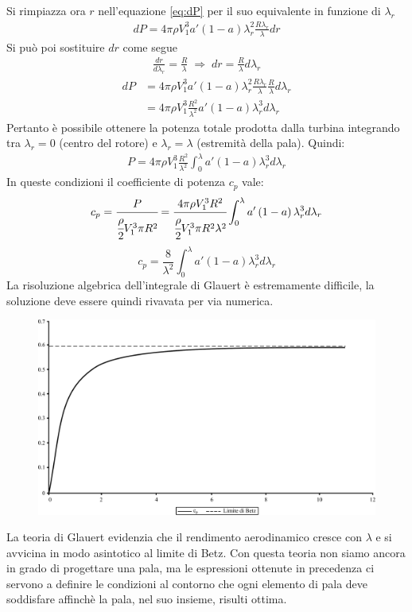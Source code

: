 Si rimpiazza ora $r$ nell'equazione \ref{eq:dP} per il suo equivalente in funzione di $\lambda_r$
\begin{align*}
dP = 4 \pi \rho V_1^3 a' \left( 1 - a \right) \lambda_r^2 \frac{R \lambda_r}{\lambda} dr
\end{align*}
Si può poi sostituire $dr$ come segue
\begin{align*}
\frac{dr}{d \lambda_r} = \frac{R}{\lambda} \; \Rightarrow \; dr = \frac{R}{\lambda} d \lambda_r
\end{align*}
\begin{align*}
dP &= 4 \pi \rho V_1^3 a' \left(1 - a \right) \lambda_r^2 \frac{R \lambda_r}{\lambda} \frac{R}{\lambda} d \lambda_r\\
&= 4 \pi \rho V_1^3 \frac{R^2}{\lambda^2} a' \left( 1 - a \right) \lambda_r^3 d\lambda_r
\end{align*}
Pertanto è possibile ottenere la potenza totale prodotta dalla turbina integrando tra $\lambda_r = 0$ (centro del rotore) e $\lambda_r = \lambda$ (estremità della pala). Quindi:
\begin{align*}
P = 4 \pi \rho V_1^3 \frac{R^2}{\lambda^2} \int_0^{\lambda} a' \left( 1 - a \right) \lambda_r^3 d \lambda_r
\end{align*}
In queste condizioni il coefficiente di potenza $c_p$ vale:
\begin{align*}
c_p = \cfrac{P}{\cfrac{\rho}{2} V_1^3 \pi R^2} = \cfrac{4 \pi \rho V_1^3 R^2}{\cfrac{\rho}{2} V_1^3 \pi R^2 \lambda^2} \int_0^{\lambda} a' \left(1 - a \right) \lambda_r^3 d \lambda_r
\end{align*}
\begin{equation}
c_p = \frac{8}{\lambda^2} \int_0^{\lambda} a' \left( 1 - a \right) \lambda_r^3 d \lambda_r
\end{equation}
La risoluzione algebrica dell'integrale di Glauert è estremamente difficile, la soluzione deve essere quindi rivavata per via numerica.
\begin{figure}[h!]
\centering
  \includegraphics[width=.7\textwidth]{fig/limBetz.pdf}
\caption{}
\label{fig:limBetz}
\end{figure}
La teoria di Glauert evidenzia che il rendimento aerodinamico cresce con $\lambda$ e si avvicina in modo asintotico al limite di Betz. 
Con questa teoria non siamo ancora in grado di progettare una pala, ma le espressioni ottenute in precedenza ci servono a definire le condizioni al contorno che ogni elemento di pala deve soddisfare affinchè la pala, nel suo insieme, risulti ottima.

